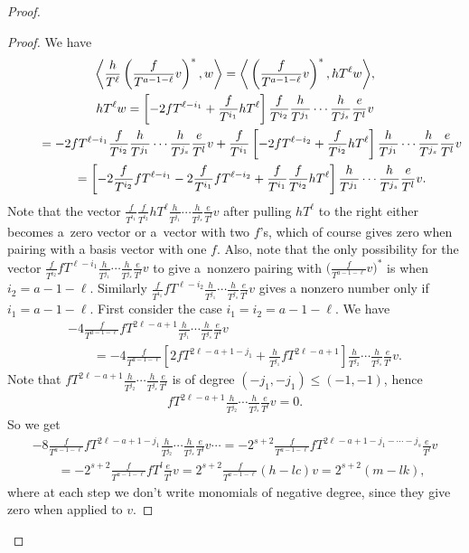 \documentclass[11pt]{article}
\numberwithin{equation}{section}
\begin{document}
\begin{proof}
\begin{proof}
We have
\begin{gather*}
\bigg\langle \frac{h}{T^\ell} \left(\frac{f}{T^{a-1-\ell}}v\right)^*, w \bigg\rangle = \bigg\langle \left(\frac{f}{T^{a-1-\ell}}v\right)^*, hT^{\ell} w \bigg\rangle,\\
hT^{\ell} w = \left[ -2fT^{\ell-i_1} + \frac{f}{T^{i_1}} hT^{\ell} \right] \frac{f}{T^{i_2}}\frac{h}{T^{j_1}} \cdots \frac{h}{T^{j_s}} \frac{e}{T^l} v \\
\hphantom{hT^{\ell} w} = -2fT^{\ell-i_1} \frac{f}{T^{i_2}}\frac{h}{T^{j_1}} \cdots \frac{h}{T^{j_s}} \frac{e}{T^l} v + \frac{f}{T^{i_1}} \left[ -2fT^{\ell-i_2} + \frac{f}{T^{i_2}} hT^{\ell} \right] \frac{h}{T^{j_1}} \cdots \frac{h}{T^{j_s}} \frac{e}{T^l} v \\
\hphantom{hT^{\ell} w} = \left[ -2 \frac{f}{T^{i_2}} fT^{\ell-i_1} - 2 \frac{f}{T^{i_1}}fT^{\ell-i_2} + \frac{f}{T^{i_1}} \frac{f}{T^{i_2}} hT^{\ell} \right] \frac{h}{T^{j_1}} \cdots \frac{h}{T^{j_s}} \frac{e}{T^l} v.
\end{gather*}
Note that the vector $\frac{f}{T^{i_1}} \frac{f}{T^{i_2}} hT^{\ell} \frac{h}{T^{j_1}} \cdots \frac{h}{T^{j_s}} \frac{e}{T^l} v$ after pulling $hT^{\ell}$ to the right either becomes a~zero vector or a~vector with two $f$'s, which of course gives zero when pairing with a basis vector with one $f$. Also, note that the only possibility for the vector $\frac{f}{T^{i_2}} fT^{\ell-i_1} \frac{h}{T^{j_1}} \cdots \frac{h}{T^{j_s}} \frac{e}{T^l} v$ to give a~nonzero pairing with $\big(\frac{f}{T^{a-1-\ell}}v\big)^*$ is when $i_2 = a-1-\ell$. Similarly $\frac{f}{T^{i_1}} fT^{\ell-i_2} \frac{h}{T^{j_1}} \cdots \frac{h}{T^{j_s}} \frac{e}{T^l} v$ gives a nonzero number only if $i_1 = a-1-\ell$. First consider the case $i_1=i_2=a-1-\ell$. We have
\begin{gather*}
- 4 \frac{f}{T^{a-1-\ell}} fT^{2\ell-a+1} \frac{h}{T^{j_1}} \cdots \frac{h}{T^{j_s}} \frac{e}{T^l} v \\
\qquad{} = - 4 \frac{f}{T^{a-1-\ell}} \left[ 2 fT^{2\ell-a+1-j_1} + \frac{h}{T^{j_1}} fT^{2\ell-a+1} \right] \frac{h}{T^{j_2}} \cdots \frac{h}{T^{j_s}} \frac{e}{T^l} v.
\end{gather*}
Note that $fT^{2\ell-a+1} \frac{h}{T^{j_2}} \cdots \frac{h}{T^{j_s}} \frac{e}{T^l}$ is of degree $(-j_1,-j_1) \leq (-1,-1)$, hence
\begin{gather*} fT^{2\ell-a+1} \frac{h}{T^{j_2}} \cdots \frac{h}{T^{j_s}} \frac{e}{T^l} v =0.\end{gather*} So we get
\begin{gather*}
 -8 \frac{f}{T^{a-1-\ell}} fT^{2\ell-a+1-j_1} \frac{h}{T^{j_2}} \cdots \frac{h}{T^{j_s}} \frac{e}{T^l} v \cdots
 = -2^{s+2} \frac{f}{T^{a-1-\ell}} fT^{2\ell-a+1-j_1-\cdots-j_s} \frac{e}{T^l} v \\
\qquad{} = - 2^{s+2} \frac{f}{T^{a-1-\ell}} fT^{l} \frac{e}{T^l} v = 2^{s+2} \frac{f}{T^{a-1-\ell}} (h - lc) v = 2^{s+2} (m - lk),
\end{gather*}
where at each step we don't write monomials of negative degree, since they give zero when applied to $v$.


\end{proof}
\end{proof}
\end{document}
